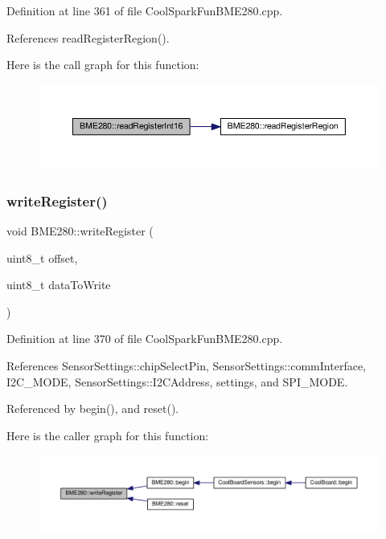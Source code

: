 Definition at line 361 of file Cool\+Spark\+Fun\+B\+M\+E280.\+cpp.



References read\+Register\+Region().

Here is the call graph for this function\+:
\nopagebreak
\begin{figure}[H]
\begin{center}
\leavevmode
\includegraphics[width=350pt]{df/dcf/class_b_m_e280_ac43c30f9b321d301694094d6b4bebe7e_cgraph}
\end{center}
\end{figure}
\mbox{\label{class_b_m_e280_afcff21c342725246bf415d7f0e4d04f0}} 
\subsubsection{\texorpdfstring{write\+Register()}{writeRegister()}}
{\footnotesize\ttfamily void B\+M\+E280\+::write\+Register (\begin{DoxyParamCaption}\item[{uint8\+\_\+t}]{offset,  }\item[{uint8\+\_\+t}]{data\+To\+Write }\end{DoxyParamCaption})}



Definition at line 370 of file Cool\+Spark\+Fun\+B\+M\+E280.\+cpp.



References Sensor\+Settings\+::chip\+Select\+Pin, Sensor\+Settings\+::comm\+Interface, I2\+C\+\_\+\+M\+O\+DE, Sensor\+Settings\+::\+I2\+C\+Address, settings, and S\+P\+I\+\_\+\+M\+O\+DE.



Referenced by begin(), and reset().

Here is the caller graph for this function\+:\nopagebreak
\begin{figure}[H]
\begin{center}
\leavevmode
\includegraphics[width=350pt]{df/dcf/class_b_m_e280_afcff21c342725246bf415d7f0e4d04f0_icgraph}
\end{center}
\end{figure}


